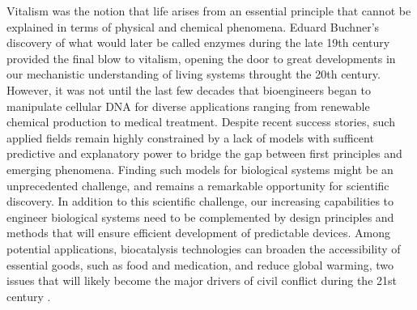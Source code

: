 Vitalism was the notion that life arises from an essential principle that cannot be explained in terms of physical and chemical phenomena.
Eduard Buchner's discovery of what would later be called enzymes during the late 19th century provided the final blow to vitalism, opening the door to
great developments in our mechanistic understanding of living systems throught the 20th century.
However, it was not until the last few decades that bioengineers began to manipulate cellular DNA for diverse applications ranging from renewable chemical production to medical treatment. Despite recent success stories, such applied fields remain highly constrained by a lack of models with sufficent predictive and explanatory power to bridge the gap between first principles and emerging phenomena.
Finding such models for biological systems might be an unprecedented challenge, and remains a remarkable opportunity for scientific discovery.
In addition to this scientific challenge, our increasing capabilities to engineer biological systems need to be complemented by design principles and methods that will ensure efficient development of predictable devices. %
Among potential applications, biocatalysis technologies can broaden the accessibility of essential goods, such as food and medication, and reduce global warming, two issues that will likely become the major drivers of civil conflict during the 21st century \citep{barnett2007, hsiang2011, dod2015}. %

